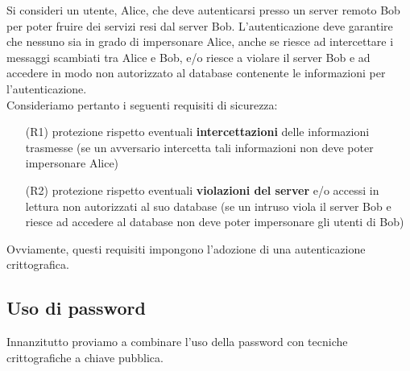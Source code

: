 Si consideri un utente, Alice, che deve autenticarsi presso un server remoto Bob per poter fruire dei servizi resi dal server Bob. L'autenticazione deve garantire che nessuno sia in grado di impersonare Alice, anche se riesce ad intercettare i messaggi scambiati tra Alice e Bob, e/o riesce a violare il server Bob e ad accedere in modo non autorizzato al database contenente le informazioni per l'autenticazione.\\
Consideriamo pertanto i seguenti requisiti di sicurezza:
\begin{itemize}
	\item [(R1)] protezione rispetto eventuali \textbf{intercettazioni} delle informazioni trasmesse (se un avversario intercetta tali informazioni non deve poter impersonare Alice)
	\item [(R2)] protezione rispetto eventuali \textbf{violazioni del server}  e/o accessi in lettura non autorizzati al suo database (se un intruso viola il server Bob e riesce ad accedere al database non deve poter impersonare gli utenti di Bob)
\end{itemize}
Ovviamente, questi requisiti impongono l'adozione di una autenticazione crittografica.
\subsection{Uso di password}
Innanzitutto proviamo a combinare l'uso della password con tecniche crittografiche a chiave pubblica.
